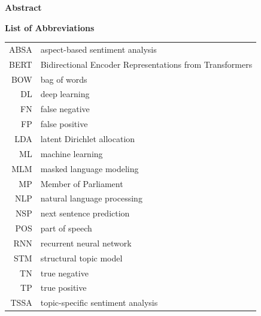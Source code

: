 \documentclass[12pt]{article}
\begin{document}

\newpage

\Large
\noindent
\textbf{Abstract}
\vspace{0.5cm} \\
\noindent
\normalsize

\newpage

\tableofcontents
\newpage

\Large
\noindent
\textbf{List of Abbreviations}
\vspace{0.5cm} \\
\noindent
\normalsize

\begin{tabular}{rl}
  ABSA & aspect-based sentiment analysis \\
  BERT & Bidirectional Encoder Representations from Transformers \\ 
  BOW & bag of words \\
  DL & deep learning \\
  FN & false negative \\
  FP & false positive \\
  LDA & latent Dirichlet allocation \\
  ML & machine learning \\
  MLM & masked language modeling \\
  MP & Member of Parliament \\
  NLP & natural language processing \\
  NSP & next sentence prediction \\
  POS & part of speech \\
  RNN & recurrent neural network \\
  STM & structural topic model \\
  TN & true negative \\
  TP & true positive \\
  TSSA & topic-specific sentiment analysis
\end{tabular}

% 
% 
\end{document}
